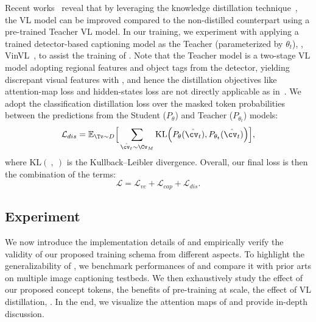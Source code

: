 Recent works~\citep{fang2021compressing,liu2021kd} reveal that by leveraging the knowledge distillation technique~\citep{hinton2015distilling}, the VL model can be improved compared to the non-distilled counterpart using a pre-trained Teacher VL model. In our training, we experiment with applying a trained detector-based captioning model as the Teacher (parameterized by $\theta_{t}$), \ie, VinVL~\citep{zhang2021multi}, to assist the training of \vitcap\!\!. Note that the Teacher model is a two-stage VL model adopting regional features and object tags from the detector, yielding discrepant visual features with \vitcap\!\!, and hence the distillation objectives like attention-map loss and hidden-states loss are not directly applicable as in~\citep{fang2021compressing}. We adopt the classification distillation loss over the masked token probabilities between the predictions from the Student ($P_\theta$) and Teacher ($P_{\theta_t}$) models:
\begin{equation}
    \mathcal{L}_{dis} = \mathbb{E}_{\Tv\sim D}\Big[\sum_{\hat{\cv_t}\sim\Cv_{M}}\text{KL}{\Big(}P_\theta(\hat{\cv_t}), P_{\theta_t}(\hat{\cv_t}){\Big)}\Big],
\end{equation}
where KL$( \ , \ )$ is the Kullback–Leibler divergence.
Overall, our final loss is then the combination of the terms:
\begin{equation}
    \mathcal{L} = \mathcal{L}_{vc} + \mathcal{L}_{cap} + \mathcal{L}_{dis}.
\end{equation}

\subsection{Experiment}
We now introduce the implementation details of \vitcap and empirically verify the validity of our proposed training schema from different aspects. 
To highlight the generalizability of \vitcap\!\!, we benchmark performances of \vitcap and compare it with prior arts on multiple image captioning testbeds. We then exhaustively study the effect of our proposed concept tokens, the benefits of pre-training at scale, the effect of VL distillation, \etc. In the end, we visualize the attention maps of \vitcap and provide in-depth discussion. 


